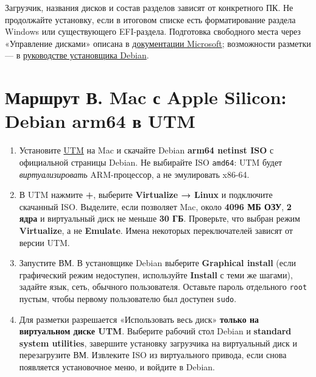 Загрузчик, названия дисков и состав разделов зависят от конкретного ПК.
Не продолжайте установку, если в итоговом списке есть форматирование
раздела Windows или существующего EFI-раздела. Подготовка свободного
места через «Управление дисками» описана в
\href{https://learn.microsoft.com/en-us/windows-server/storage/disk-management/shrink-a-basic-volume}{документации
Microsoft}; возможности разметки --- в
\href{https://www.debian.org/releases/stable/amd64/ch06s03.en.html}{руководстве
установщика Debian}.

\hypertarget{ux43cux430ux440ux448ux440ux443ux442-ux432-mac-ux441-apple-silicon-debian-arm64-ux432-utm}{%
\section{Маршрут В. Mac с Apple Silicon: Debian arm64 в
UTM}\label{ux43cux430ux440ux448ux440ux443ux442-ux432-mac-ux441-apple-silicon-debian-arm64-ux432-utm}}

\begin{enumerate}
\def\labelenumi{\arabic{enumi}.}
\tightlist
\item
  Установите \href{https://getutm.app/}{UTM} на Mac и скачайте Debian
  \textbf{arm64 netinst ISO} с официальной страницы Debian. Не выбирайте
  ISO \texttt{amd64}: UTM будет \emph{виртуализировать} ARM-процессор, а
  не эмулировать x86-64.
\item
  В UTM нажмите \textbf{+}, выберите \textbf{Virtualize → Linux} и
  подключите скачанный ISO. Выделите, если позволяет Mac, около
  \textbf{4096 МБ ОЗУ}, \textbf{2 ядра} и виртуальный диск не меньше
  \textbf{30 ГБ}. Проверьте, что выбран режим \textbf{Virtualize}, а не
  \textbf{Emulate}. Имена некоторых переключателей зависят от версии
  UTM.
\item
  Запустите ВМ. В установщике Debian выберите \textbf{Graphical install}
  (если графический режим недоступен, используйте \textbf{Install} с
  теми же шагами), задайте язык, сеть, обычного пользователя. Оставьте
  пароль отдельного \texttt{root} пустым, чтобы первому пользователю был
  доступен \texttt{sudo}.
\item
  Для разметки разрешается «Использовать весь диск» \textbf{только на
  виртуальном диске UTM}. Выберите рабочий стол Debian и
  \textbf{standard system utilities}, завершите установку загрузчика на
  виртуальный диск и перезагрузите ВМ. Извлеките ISO из виртуального
  привода, если снова появляется установочное меню, и войдите в Debian.
\end{enumerate}

